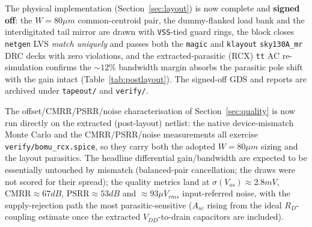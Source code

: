 \documentclass{article}
\begin{document}
The physical implementation (Section~\ref{sec:layout}) is now complete and
\textbf{signed off}: the $W=80\mu m$ common-centroid pair, the dummy-flanked load bank
and the interdigitated tail mirror are drawn with \texttt{VSS}-tied guard rings, the
block closes \texttt{netgen} LVS \emph{match uniquely} and passes both the \texttt{magic}
and \texttt{klayout} \texttt{sky130A\_mr} DRC decks with zero violations, and the
extracted-parasitic (RCX) \texttt{tt} AC re-simulation confirms the $\sim12\%$
bandwidth margin absorbs the parasitic pole shift with the gain intact
(Table~\ref{tab:postlayout}). The signed-off GDS and reports are archived under
\texttt{tapeout/} and \texttt{verify/}.

The offset/CMRR/PSRR/noise characterisation of Section~\ref{sec:quality} is now run
directly on the extracted (post-layout) netlist: the native device-mismatch Monte Carlo
and the CMRR/PSRR/noise measurements all exercise \texttt{verify/bomu\_rcx.spice}, so
they carry both the adopted $W{=}80\mu m$ sizing and the layout parasitics. The headline
differential gain/bandwidth are expected to be essentially untouched by mismatch
(balanced-pair cancellation; the draws were not scored for their spread);
the quality metrics land at $\sigma(V_{os})\approx2.8mV$, $\text{CMRR}\approx67dB$,
$\text{PSRR}\approx53dB$ and $\approx93\mu V_{rms}$ input-referred noise, with the
supply-rejection path the most parasitic-sensitive ($A_{sc}$ rising from the ideal
$R_D$-coupling estimate once the extracted $V_{DD}$-to-drain capacitors are included).
\end{document}
